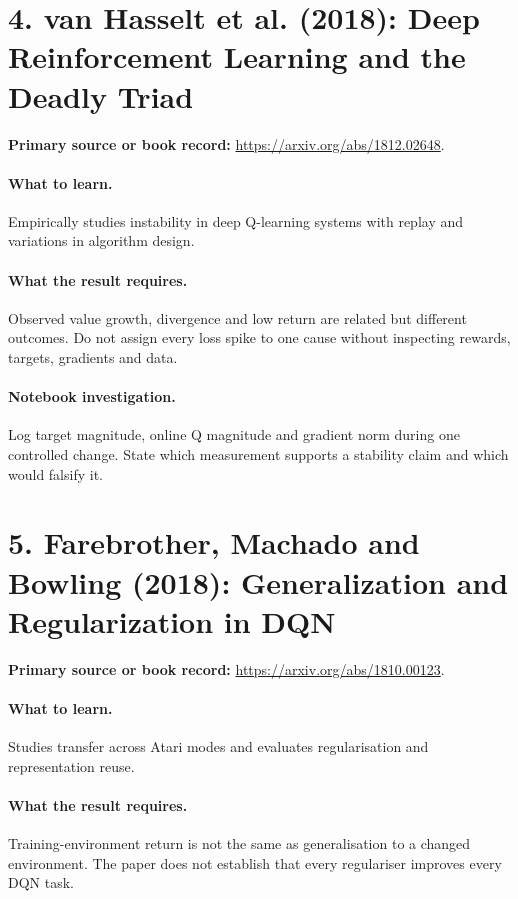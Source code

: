 \documentclass[11pt]{scrartcl}
\begin{document}
\section*{4. van Hasselt et al. (2018): Deep Reinforcement Learning and the Deadly Triad}
\textbf{Primary source or book record:} \url{https://arxiv.org/abs/1812.02648}.

\paragraph{What to learn.} Empirically studies instability in deep Q-learning systems with replay and variations in algorithm design.

\paragraph{What the result requires.} Observed value growth, divergence and low return are related but different outcomes. Do not assign every loss spike to one cause without inspecting rewards, targets, gradients and data.

\paragraph{Notebook investigation.} Log target magnitude, online Q magnitude and gradient norm during one controlled change. State which measurement supports a stability claim and which would falsify it.

\section*{5. Farebrother, Machado and Bowling (2018): Generalization and Regularization in DQN}
\textbf{Primary source or book record:} \url{https://arxiv.org/abs/1810.00123}.

\paragraph{What to learn.} Studies transfer across Atari modes and evaluates regularisation and representation reuse.

\paragraph{What the result requires.} Training-environment return is not the same as generalisation to a changed environment. The paper does not establish that every regulariser improves every DQN task.
\end{document}
